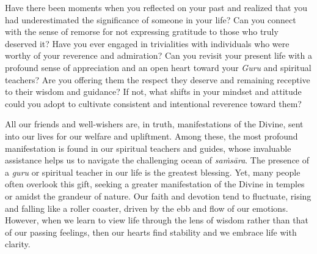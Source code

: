 \newpage
\begin{mananam}{}
\normalfont\mananamtext Have there been moments when you reflected on your past and realized that you had underestimated the significance of someone in your life? Can you connect with the sense of remorse for not expressing gratitude to those who truly deserved it? Have you ever engaged in trivialities with individuals who were worthy of your reverence and admiration?
Can you revisit your present life with a profound sense of appreciation and an open heart toward your \emph{Guru} and spiritual teachers? Are you offering them the respect they deserve and remaining receptive to their wisdom and guidance? If not, what shifts in your mindset and attitude could you adopt to cultivate consistent and intentional reverence toward them?
\end{mananam}
\sreflect
\begin{inspiration}{}
\normalfont\mananamtext All our friends and well-wishers are, in truth, manifestations of the Divine, sent into our lives for our welfare and upliftment. Among these, the most profound manifestation is found in our spiritual teachers and guides, whose invaluable assistance helps us to navigate the challenging ocean of \emph{saṁsāra}. 
The presence of a \emph{guru} or spiritual teacher in our life is the greatest blessing. Yet, many people often overlook this gift, seeking a greater manifestation of the Divine in temples or amidst the grandeur of nature. Our faith and devotion tend to fluctuate, rising and falling like a roller coaster, driven by the ebb and flow of our emotions. However, when we learn to view life through the lens of wisdom rather than that of our passing feelings, then our hearts find stability and we embrace life with clarity.
\end{inspiration}
\newpage

